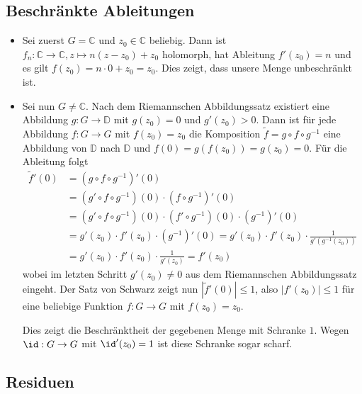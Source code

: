 \documentclass[a4paper]{article}
\begin{document}
\subsection{Beschränkte Ableitungen}

\begin{itemize}
    \item Sei zuerst $G = \mathds{C}$ und $z_0 \in \mathds{C}$ beliebig.
    Dann ist $f_n: \mathds{C} \to \mathds{C}, z \mapsto n(z - z_0) + z_0$ holomorph, hat Ableitung $f'(z_0) = n$ und es gilt $f(z_0) = n \cdot 0  + z_0 = z_0$.
    Dies zeigt, dass unsere Menge unbeschränkt ist.
    \item Sei nun $G \neq \mathds{C}$.
    Nach dem Riemannschen Abbildungssatz existiert eine Abbildung $g: G \to \mathds{D}$ mit $g(z_0) = 0$ und $g'(z_0) > 0$.
    Dann ist für jede Abbildung $f: G \to G$ mit $f(z_0) = z_0$ die Komposition $\tilde{f} = g \circ f \circ g^{-1}$ eine Abbildung von $\mathds{D}$ nach $\mathds{D}$ und $f(0) = g(f(z_0)) = g(z_0) = 0$.
    Für die Ableitung folgt
    \begin{align*}
        \tilde{f}'(0) &= (g \circ f \circ g^{-1})'(0)\\
        &= (g' \circ f \circ g^{-1})(0) \cdot (f \circ g^{-1})'(0)\\
        &= (g' \circ f \circ g^{-1})(0) \cdot (f' \circ g^{-1})(0) \cdot (g^{-1})'(0)\\
        &= g'(z_0) \cdot f'(z_0) \cdot (g^{-1})'(0) = g'(z_0) \cdot f'(z_0) \cdot \frac{1}{g'(g^{-1}(z_0))}\\
        &= g'(z_0) \cdot f'(z_0) \cdot \frac{1}{g'(z_0)} = f'(z_0)
    \end{align*}
    wobei im letzten Schritt $g'(z_0) \neq 0$ aus dem Riemannschen Abbildungssatz eingeht.
    Der Satz von Schwarz zeigt nun $|\tilde{f}'(0)| \leq 1$, also $|f'(z_0)| \leq 1$ für eine beliebige Funktion $f: G \to G$ mit $f(z_0) = z_0$.
    
    Dies zeigt die Beschränktheit der gegebenen Menge mit Schranke $1$. Wegen $\id: G \to G$ mit $\id'(z_0) = 1$ ist diese Schranke sogar scharf.


\end{itemize}

\subsection{Residuen}
\end{document}
